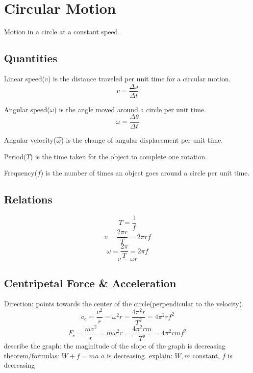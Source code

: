 \documentclass[11pt, a4paper,oneside]{book}
\begin{document}
\section{Circular Motion}
\begin{definition}
    Motion in a circle at a constant speed.	
\end{definition}
\subsection{Quantities}
\begin{definition}
    Linear speed($ v $) is the distance traveled per unit time for a circular motion.
    \[
        v = \frac{\Delta s}{\Delta t}
    \]
\end{definition}
\begin{definition}
    Angular speed($ \omega $) is the angle moved around a circle per unit time.
    \[
        \omega = \frac{\Delta \theta}{\Delta t}
    \]
\end{definition}
\begin{definition}
    Angular velocity($ \vec{\omega} $) is the change of angular displacement per unit time.
\end{definition}
\begin{definition}[Period]
    Period($ T $) is the time taken for the object to complete one rotation.	
\end{definition}
\begin{definition}[Frequency]
    Frequency($ f $) is the number of times an object goes around a circle per unit time.	
\end{definition}
\subsection{Relations}
\[
    T = \frac{1}{f}
\]
\[
    v = \frac{2\pi r}{T} = 2\pi r f
\]
\[
    \omega = \frac{2\pi}{T} = 2\pi f
\]
\[
    v = \omega r
\]
\subsection{Centripetal Force \& Acceleration}
Direction: points towards the center of the circle(perpendicular to the velocity).
\[
    a_c = \frac{v^2}{r} = {\omega}^2r = \frac{4{\pi}^2r}{T^2} = 4{\pi}^2rf^2
\]
\[
    F_c = \frac{mv^2}{r} = m{\omega}^2r = \frac{4{\pi}^2rm}{T^2} = 4{\pi}^2rmf^2
\]
describe the graph: the maginitude of the slope of the graph is decreasing
theorem/formulas: $ W + f = ma $ $ a $ is decreasing.
explain: $ W, m $ constant, $ f $ is decreasing
\end{document}
